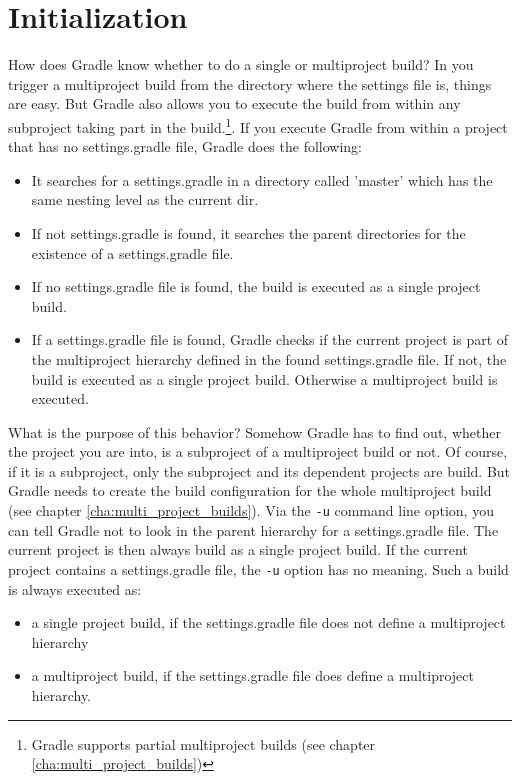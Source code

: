 \section{Initialization} %
\label{sec:initialization}
How does Gradle know whether to do a single or multiproject build? In you trigger a multiproject build from the directory where the settings file is, things are easy. But Gradle also allows you to execute the build from within any subproject taking part in the build.\footnote{Gradle supports partial multiproject builds (see chapter \ref{cha:multi_project_builds})}. If you execute Gradle from within a project that has no settings.gradle file, Gradle does the following:
\begin{itemize}
	\item It searches for a settings.gradle in a directory called 'master' which has the same nesting level as the current dir. 
	\item If not settings.gradle is found, it searches the parent directories for the existence of a settings.gradle file.
	\item If no settings.gradle file is found, the build is executed as a single project build.
    \item If a settings.gradle file is found, Gradle checks if the current project is part of the multiproject hierarchy defined in the found settings.gradle file. If not, the build is executed as a single project build. Otherwise a multiproject build is executed.
\end{itemize}
What is the purpose of this behavior? Somehow Gradle has to find out, whether the project you are into, is a subproject of a multiproject build or not. Of course, if it is a subproject, only the subproject and its dependent projects are build. But Gradle needs to create the build configuration for the whole multiproject build (see chapter \ref{cha:multi_project_builds}). Via the \texttt{-u} command line option, you can tell Gradle not to look in the parent hierarchy for a settings.gradle file. The current project is then always build as a single project build. If the current project contains a settings.gradle file, the \texttt{-u} option has no meaning. Such a build is always executed as:
\begin{itemize}
	\item a single project build, if the settings.gradle file does not define a multiproject hierarchy
    \item a multiproject build, if the settings.gradle file does define a multiproject hierarchy.
\end{itemize}

